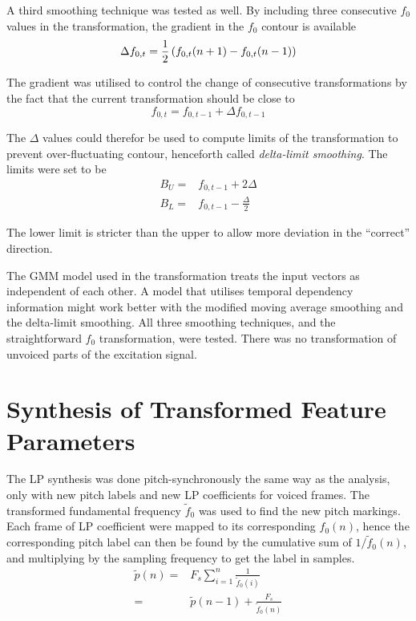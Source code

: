 A third smoothing technique was tested as well. By including three consecutive $f_0$ values in the transformation, the gradient in the $f_0$ contour is available
\begin{equation}
	\Delta f_{0,t} = \frac{1}{2}\left(f_{0,t}(n+1)-f_{0,t}(n-1)\right)
\end{equation}

The gradient was utilised to control the change of consecutive transformations by the fact that the current transformation should be close to
\begin{equation}
	f_{0,t} = f_{0,t-1} + \Delta f_{0,t-1}
\end{equation}

The $\Delta$ values could therefor be used to compute limits of the transformation to prevent over-fluctuating contour, henceforth called \emph{delta-limit smoothing}. The limits were set to be
\begin{equation}
	\begin{split}
		B_U = & f_{0,t-1} + 2\Delta\\
		B_L = & f_{0,t-1} - \frac{\Delta}{2}
	\end{split}
\end{equation} 
\begin{remark}
	The lower limit is stricter than the upper to allow more deviation in the ``correct'' direction.
\end{remark}

The GMM model used in the transformation treats the input vectors as independent of each other. A model that utilises temporal dependency information might work better with the modified moving average smoothing and the delta-limit smoothing. All three smoothing techniques, and the straightforward $f_0$ transformation, were tested. There was no transformation of unvoiced parts of the excitation signal. 


\section{Synthesis of Transformed Feature Parameters} %
\label{sec:synthesis_of_transformed_feature_parameters}

The LP synthesis was done pitch-synchronously the same way as the analysis, only with new pitch labels and new LP coefficients for voiced frames. The transformed fundamental frequency $\tilde{f}_0$ was used to find the new pitch markings. Each frame of LP coefficient were mapped to its corresponding $f_0(n)$, hence the corresponding pitch label can then be found by the cumulative sum of $1/\tilde{f}_0(n)$, and multiplying by the sampling frequency to get the label in samples.
\begin{equation}
	\begin{split}
		\tilde{p}(n) =& F_s \sum_{i=1}^{n}\frac{1}{\tilde{f}_0(i)} \\
		 =& \tilde{p}(n-1) + \frac{F_s}{\tilde{f}_0(n)} \\
	\end{split}
\end{equation}

